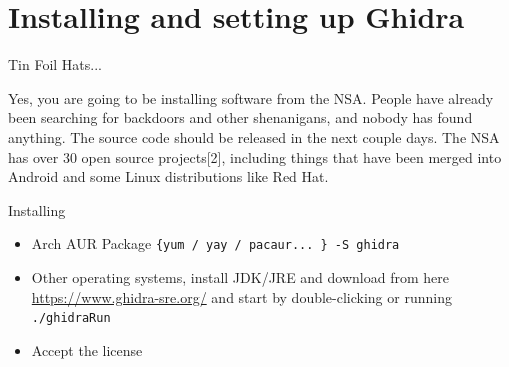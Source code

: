 \documentclass{beamer}
\begin{document}
\section{Installing and setting up Ghidra}

\begin{frame}{Tin Foil Hats...}

  Yes, you are going to be installing software from the NSA. People
  have already been searching for backdoors and other shenanigans, and
  nobody has found anything. The source code should be released in the
  next couple days. The NSA has over 30 open source projects[2],
  including things that have been merged into Android and some Linux
  distributions like Red Hat.
\end{frame}

\begin{frame}{Installing}
  \begin{itemize}
    \item Arch AUR Package \texttt{\{yum / yay / pacaur... \} -S
        ghidra}
      \item Other operating systems, install JDK/JRE and download from
        here \url{https://www.ghidra-sre.org/} and start by
        double-clicking or running \texttt{./ghidraRun}
      \item Accept the license
  \end{itemize}
\end{frame}
\end{document}
